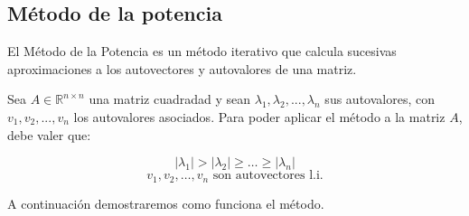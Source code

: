 \subsection{Método de la potencia}\label{metodo_potencia}

El Método de la Potencia es un método iterativo que calcula sucesivas aproximaciones a los autovectores y autovalores de una matriz.

Sea $A\in\mathbb{R}^{n \times n}$ una matriz cuadradad y sean $\lambda_1,\lambda_2,...,\lambda_n$
sus autovalores, con $v_1,v_2,...,v_n$ los autovalores asociados. Para poder aplicar el método a
la matriz $A$, debe valer que:

$$|\lambda_1| > |\lambda_2| \geq \dots \geq |\lambda_n|$$
$$v_1, v_2, \dots, v_n \text{ son autovectores l.i.}$$

A continuación demostraremos como funciona el método.

